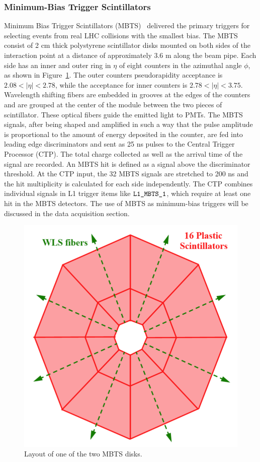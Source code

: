 \subsubsection{Minimum-Bias Trigger Scintillators}

Minimum Bias Trigger Scintillators (MBTS)~\cite{Sidoti:2014kra} delivered the primary triggers for selecting events from real LHC collisions with the smallest bias. The MBTS consist of 2 cm thick polystyrene scintillator disks mounted on both sides of the interaction point at a distance of approximately 3.6 m along the beam pipe. Each side has an inner and outer ring in $\eta$ of eight counters in the azimuthal angle $\phi$, as shown in Figure~\ref{fig:detector_ATLAS_MBTS}. The outer counters pseudorapidity acceptance is $2.08 < |\eta| < 2.78$, while the acceptance for inner counters is $2.78 < |\eta| < 3.75$. Wavelength shifting fibers are embedded in grooves at the edges of the counters and are grouped at the center of the module between the two pieces of scintillator. These optical fibers guide the emitted light to PMTs. The MBTS signals, after being shaped and amplified in such a way that the pulse amplitude is proportional to the amount of energy deposited in the counter, are fed into leading edge discriminators and sent as 25 ns pulses to the Central Trigger Processor (CTP). The total charge collected as well as the arrival time of the signal are recorded. An MBTS hit is defined as a signal above the discriminator threshold. At the CTP input, the 32 MBTS signals are stretched to 200 ns and the hit multiplicity is calculated for each side independently. The CTP combines individual signals in L1 trigger items like $\verb|L1_MBTS_1|$, which require at least one hit in the MBTS detectors. The use of MBTS as minimum-bias triggers will be discussed in the data acquisition section.

\begin{figure}[H]
\centering
\includegraphics[width=.475\linewidth]{figs/chapter_detector/ATLAS_MBTS.png}
\caption{Layout of one of the two MBTS disks.}
\label{fig:detector_ATLAS_MBTS}
\end{figure}



